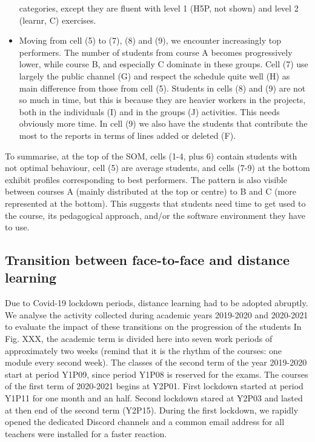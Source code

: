 \documentclass[
]{article}
\begin{document}
\begin{itemize}
  categories, except they are fluent with level 1 (H5P, not shown) and
  level 2 (learnr, C) exercises.
\item
  Moving from cell (5) to (7), (8) and (9), we encounter increasingly
  top performers. The number of students from course A becomes
  progressively lower, while course B, and especially C dominate in
  these groups. Cell (7) use largely the public channel (G) and respect
  the schedule quite well (H) as main difference from those from cell
  (5). Students in cells (8) and (9) are not so much in time, but this
  is because they are heavier workers in the projects, both in the
  individuals (I) and in the groups (J) activities. This needs obviously
  more time. In cell (9) we also have the students that contribute the
  most to the reports in terms of lines added or deleted (F).
\end{itemize}

To summarise, at the top of the SOM, cells (1-4, plus 6) contain
students with not optimal behaviour, cell (5) are average students, and
cells (7-9) at the bottom exhibit profiles corresponding to best
performers. The pattern is also visible between courses A (mainly
distributed at the top or centre) to B and C (more represented at the
bottom). This suggests that students need time to get used to the
course, its pedagogical approach, and/or the software environment they
have to use.

\hypertarget{transition-between-face-to-face-and-distance-learning}{%
\subsection{Transition between face-to-face and distance
learning}\label{transition-between-face-to-face-and-distance-learning}}

Due to Covid-19 lockdown periods, distance learning had to be adopted
abruptly. We analyse the activity collected during academic years
2019-2020 and 2020-2021 to evaluate the impact of these transitions on
the progression of the students In Fig. XXX, the academic term is
divided here into seven work periods of approximately two weeks (remind
that it is the rhythm of the courses: one module every second week). The
classes of the second term of the year 2019-2020 start at period Y1P09,
since period Y1P08 is reserved for the exams. The courses of the first
term of 2020-2021 begins at Y2P01. First lockdown started at period
Y1P11 for one month and an half. Second lockdown stared at Y2P03 and
lasted at then end of the second term (Y2P15). During the first
lockdown, we rapidly opened the dedicated Discord channels and a common
email address for all teachers were installed for a faster reaction.
\end{document}

